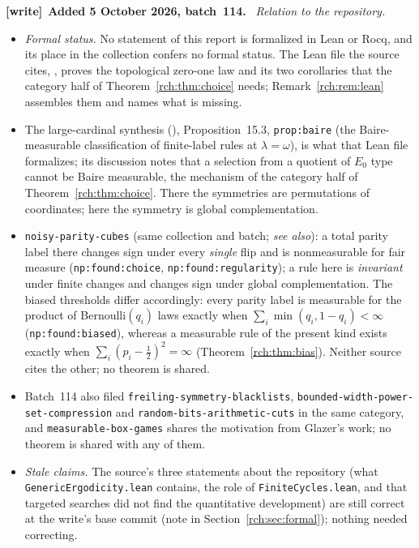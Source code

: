 \documentclass[11pt]{article}
\theoremstyle{definition}
\theoremstyle{remark}
\newcommand{\file}[1]{\nolinkurl{#1}}
\newenvironment{writenote}[1][]{\par\smallskip\begingroup\small
 \noindent\textbf{[write]}\if\relax\detokenize{#1}\relax\else~\textbf{#1.}\fi\ }%
 {\par\endgroup\smallskip}
\begin{document}
\begin{writenote}[Added 5 October 2026, batch~114]
\emph{Relation to the repository.}
\begin{itemize}\raggedright
\item \emph{Formal status.} No statement of this report is formalized in
 Lean or Rocq, and its place in the collection confers no formal status.
 The Lean file the source cites,
 ,
 proves the topological zero-one law and its two corollaries that the
 category half of Theorem~\ref{rch:thm:choice} needs;
 Remark~\ref{rch:rem:lean} assembles them and names what is missing.
\item The large-cardinal synthesis
 (),
 Proposition~15.3, \file{prop:baire} (the Baire-measurable classification of finite-label rules
 at $\lambda=\omega$), is what that Lean file formalizes; its discussion
 notes that a selection from a quotient of $E_0$ type cannot be Baire
 measurable, the mechanism of the category half of
 Theorem~\ref{rch:thm:choice}. There the symmetries are permutations of
 coordinates; here the symmetry is global complementation.
\item \file{noisy-parity-cubes} (same collection and batch; \emph{see
 also}): a total parity label there changes sign under every
 \emph{single} flip and is nonmeasurable for fair measure
 (\file{np:found:choice}, \file{np:found:regularity}); a rule here is
 \emph{invariant} under finite changes and changes sign under global
 complementation. The biased thresholds differ accordingly: every parity
 label is measurable for the product of Bernoulli$(q_i)$ laws exactly when
 $\sum_i\min(q_i,1-q_i)<\infty$ (\file{np:found:biased}), whereas a
 measurable rule of the present kind exists exactly when
 $\sum_i(p_i-\frac12)^2=\infty$ (Theorem~\ref{rch:thm:bias}). Neither
 source cites the other; no theorem is shared.
\item Batch~114 also filed \file{freiling-symmetry-blacklists},
 \file{bounded-width-power-set-compression} and
 \file{random-bits-arithmetic-cuts} in the same category, and
 \file{measurable-box-games} shares the motivation from Glazer's work; no
 theorem is shared with any of them.
\item \emph{Stale claims.} The source's three statements about the repository
 (what \file{GenericErgodicity.lean} contains, the role of
 \file{FiniteCycles.lean}, and that targeted searches did not find the
 quantitative development) are still correct at the write's base commit
 (note in Section~\ref{rch:sec:formal}); nothing needed correcting.
\end{itemize}
\end{writenote}
\end{document}
